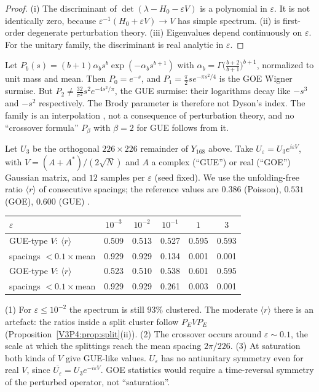 \begin{proof}
(i) The discriminant of $\det(\lambda-H_0-\varepsilon V)$ is a polynomial in $\varepsilon$. It is
not identically zero, because $\varepsilon^{-1}(H_0+\varepsilon V)\to V$ has simple spectrum. (ii) is
first-order degenerate perturbation theory. (iii) Eigenvalues depend continuously on
$\varepsilon$. For the unitary family, the discriminant is real analytic in $\varepsilon$.
\end{proof}

\begin{proposition}\label{V3P4:prop:brody}
Let $P_b(s)=(b+1)\alpha_bs^{b}\exp(-\alpha_bs^{b+1})$ with
$\alpha_b=\Gamma\bigl(\frac{b+2}{b+1}\bigr)^{b+1}$, normalized to unit mass and mean. Then
$P_0=e^{-s}$, and $P_1=\frac\pi2se^{-\pi s^{2}/4}$ is the GOE Wigner surmise. But
$P_2\neq\frac{32}{\pi^{2}}s^{2}e^{-4s^{2}/\pi}$, the GUE surmise: their logarithms decay like
$-s^{3}$ and $-s^{2}$ respectively. The Brody parameter is therefore not Dyson's index. The
family is an interpolation \cite{Brody73}, not a consequence of perturbation theory, and no
``crossover formula'' $P_\beta$ with $\beta=2$ for GUE follows from it.
\end{proposition}

\begin{remark}\label{V3P4:rem:numerics}
Let $U_3$ be the orthogonal $226\times226$ remainder of $Y_{168}$ above. Take
$U_\varepsilon=U_3e^{i\varepsilon V}$, with $V=(A+A^{*})/(2\sqrt N)$ and $A$ a complex (``GUE'') or
real (``GOE'') Gaussian matrix, and $12$ samples per $\varepsilon$ (seed fixed). We use the
unfolding-free ratio $\langle r\rangle$ of consecutive spacings; the reference values are
$0.386$ (Poisson), $0.531$ (GOE), $0.600$ (GUE) \cite{Atas13}.
\begin{center}
\begin{tabular}{lccccc}
\toprule
$\varepsilon$ & $10^{-3}$ & $10^{-2}$ & $10^{-1}$ & $1$ & $3$\\
\midrule
GUE-type $V$: $\langle r\rangle$ & 0.509 & 0.513 & 0.527 & 0.595 & 0.593\\
\quad spacings $<0.1\times$mean & 0.929 & 0.929 & 0.134 & 0.001 & 0.001\\
GOE-type $V$: $\langle r\rangle$ & 0.523 & 0.510 & 0.538 & 0.601 & 0.595\\
\quad spacings $<0.1\times$mean & 0.929 & 0.929 & 0.261 & 0.003 & 0.001\\
\bottomrule
\end{tabular}
\end{center}
(1) For $\varepsilon\le10^{-2}$ the spectrum is still $93\%$ clustered. The moderate
$\langle r\rangle$ there is an artefact: the ratios inside a split cluster follow
$P_EVP_E$ (Proposition~\ref{V3P4:prop:split}(ii)). (2) The crossover occurs around
$\varepsilon\sim0.1$, the scale at which the splittings reach the mean spacing $2\pi/226$.
(3) At saturation both kinds of $V$ give GUE-like values. $U_\varepsilon$ has no antiunitary
symmetry even for real $V$, since $\overline{U_\varepsilon}=U_3e^{-i\varepsilon V}$. GOE statistics
would require a time-reversal symmetry of the perturbed operator, not ``saturation''.
\end{remark}

